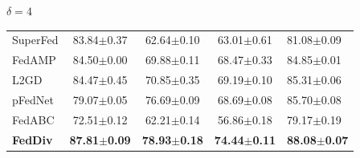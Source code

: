 \documentclass[journal]{IEEEtran}
\begin{document}
\begin{table}
\begin{subtable}[]{$\delta=4$}
\begin{tabular}{@{}lcccl@{}}
			SuperFed        & 83.84$\pm$0.37          & 62.64$\pm$0.10          & 63.01$\pm$0.61          & 81.08$\pm$0.09          \\
			FedAMP          & 84.50$\pm$0.00          & 69.88$\pm$0.11          & 68.47$\pm$0.33          & 84.85$\pm$0.01          \\
			L2GD            & 84.47$\pm$0.45          & 70.85$\pm$0.35          & 69.19$\pm$0.10          & 85.31$\pm$0.06          \\
			pFedNet         & 79.07$\pm$0.05          & 76.69$\pm$0.09          & 68.69$\pm$0.08          & 85.70$\pm$0.08          \\
			FedABC          & 72.51$\pm$0.12          & 62.21$\pm$0.14          & 56.86$\pm$0.18          & 79.17$\pm$0.19          \\
			\textbf{FedDiv} & \textbf{87.81$\pm$0.09} & \textbf{78.93$\pm$0.18}          & \textbf{74.44$\pm$0.11} & \textbf{88.08$\pm$0.07}      \\ \bottomrule 
		\end{tabular}
	\end{subtable}
	
\end{table}	
\end{document}
